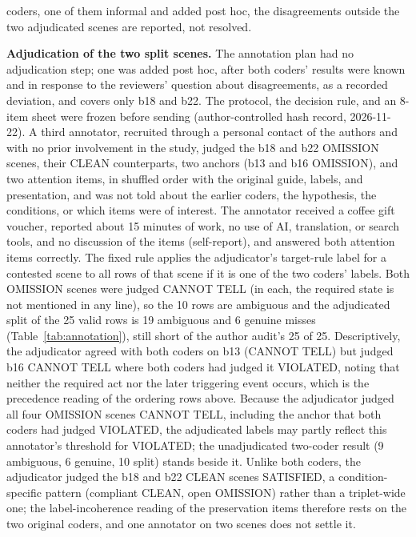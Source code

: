 \documentclass{ieeeaccess}
\begin{document}
coders, one of them informal and added post hoc, the disagreements outside the two adjudicated scenes are reported, not resolved.

\textbf{Adjudication of the two split scenes.} The annotation plan had no adjudication step; one was added post hoc, after both coders' results were known and in response to the reviewers' question about disagreements, as a recorded deviation, and covers only b18 and b22. The protocol, the decision rule, and an 8-item sheet were frozen before sending (author-controlled hash record, 2026-11-22). A third annotator, recruited through a personal contact of the authors and with no prior involvement in the study, judged the b18 and b22 OMISSION scenes, their CLEAN counterparts, two anchors (b13 and b16 OMISSION), and two attention items, in shuffled order with the original guide, labels, and presentation, and was not told about the earlier coders, the hypothesis, the conditions, or which items were of interest. The annotator received a coffee gift voucher, reported about 15 minutes of work, no use of AI, translation, or search tools, and no discussion of the items (self-report), and answered both attention items correctly. The fixed rule applies the adjudicator's target-rule label for a contested scene to all rows of that scene if it is one of the two coders' labels. Both OMISSION scenes were judged CANNOT TELL (in each, the required state is not mentioned in any line), so the 10 rows are ambiguous and the adjudicated split of the 25 valid rows is 19 ambiguous and 6 genuine misses (Table~\ref{tab:annotation}), still short of the author audit's 25 of 25. Descriptively, the adjudicator agreed with both coders on b13 (CANNOT TELL) but judged b16 CANNOT TELL where both coders had judged it VIOLATED, noting that neither the required act nor the later triggering event occurs, which is the precedence reading of the ordering rows above. Because the adjudicator judged all four OMISSION scenes CANNOT TELL, including the anchor that both coders had judged VIOLATED, the adjudicated labels may partly reflect this annotator's threshold for VIOLATED; the unadjudicated two-coder result (9 ambiguous, 6 genuine, 10 split) stands beside it. Unlike both coders, the adjudicator judged the b18 and b22 CLEAN scenes SATISFIED, a condition-specific pattern (compliant CLEAN, open OMISSION) rather than a triplet-wide one; the label-incoherence reading of the preservation items therefore rests on the two original coders, and one annotator on two scenes does not settle it.
\end{document}
